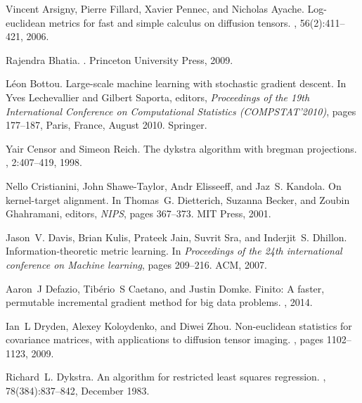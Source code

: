 \documentclass[10pt,onecolumn]{article}
\theoremstyle{definition}
\theoremstyle{definition}
\theoremstyle{definition}
\theoremstyle{definition}
\theoremstyle{definition}
\theoremstyle{theorem}
\newcommand{\0}{{\bm{0}}}
\newcommand{\1}{{\bm{1}}}
\begin{document}

\begin{thebibliography}{10}

Vincent Arsigny, Pierre Fillard, Xavier Pennec, and Nicholas Ayache.
\newblock Log-euclidean metrics for fast and simple calculus on diffusion
  tensors.
, 56(2):411--421, 2006.

Rajendra Bhatia.
.
\newblock Princeton University Press, 2009.

L\'{e}on Bottou.
\newblock Large-scale machine learning with stochastic gradient descent.
\newblock In Yves Lechevallier and Gilbert Saporta, editors, {\em Proceedings
  of the 19th International Conference on Computational Statistics
  (COMPSTAT'2010)}, pages 177--187, Paris, France, August 2010. Springer.

Yair Censor and Simeon Reich.
\newblock The dykstra algorithm with bregman projections.
, 2:407--419, 1998.

Nello Cristianini, John Shawe-Taylor, Andr Elisseeff, and Jaz~S. Kandola.
\newblock On kernel-target alignment.
\newblock In Thomas~G. Dietterich, Suzanna Becker, and Zoubin Ghahramani,
  editors, {\em NIPS}, pages 367--373. MIT Press, 2001.

Jason~V. Davis, Brian Kulis, Prateek Jain, Suvrit Sra, and Inderjit~S. Dhillon.
\newblock Information-theoretic metric learning.
\newblock In {\em Proceedings of the 24th international conference on Machine
  learning}, pages 209--216. ACM, 2007.

Aaron~J Defazio, Tib{\'e}rio~S Caetano, and Justin Domke.
\newblock Finito: A faster, permutable incremental gradient method for big data
  problems.
, 2014.

Ian~L Dryden, Alexey Koloydenko, and Diwei Zhou.
\newblock Non-euclidean statistics for covariance matrices, with applications
  to diffusion tensor imaging.
, pages 1102--1123, 2009.

Richard~L. Dykstra.
\newblock An algorithm for restricted least squares regression.
,
  78(384):837--842, December 1983.


\end{thebibliography}
\end{document}
